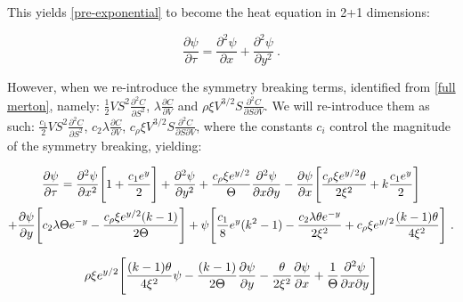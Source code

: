 \documentclass[english,12pt]{article}
\begin{document}
This yields \ref{pre-exponential} to become the heat equation in 2+1 dimensions:


\begin{equation}
\frac{\partial \psi}{\partial \tau} = \frac{\partial^2 \psi}{\partial x} + \frac{\partial^2 \psi}{\partial y^2}~.
\end{equation}





However, when we re-introduce the symmetry breaking terms, identified from \ref{full merton}, namely: $\frac{1}{2} V S^2 \frac{\partial^2 C}{\partial S^2}$,  $\lambda \frac{\partial C}{\partial V} $ and $\rho \xi V^{3/2} S \frac{\partial^2 C}{\partial S \partial V} $. We will re-introduce them as such:  $\frac{c_1}{2} V S^2 \frac{\partial^2 C}{\partial S^2}$, $c_2 \lambda \frac{\partial C}{\partial V}$, $c_{\rho} \xi V^{3/2} S \frac{\partial^2 C}{\partial S \partial V} $, where the constants $c_{i}$ control the magnitude of the symmetry breaking, yielding:

\begin{multline}
\frac{\partial \psi}{\partial \tau} = \frac{\partial^2 \psi}{\partial x^{2}}\Bigg{[}  1 +  \frac{c_{1}e^{y}}{2}  \Bigg{]} + \frac{\partial^2 \psi}{\partial y^2} + \frac{c_{\rho}\xi e^{y/2}}{\Theta}\frac{\partial^{2}\psi}{\partial x\partial y} - \frac{\partial \psi}{\partial x} \Bigg{[}\frac{ c_{\rho}\xi e^{y/2} \theta}{2\xi^{2}}  + k \frac{c_{1}e^{y}}{2}    \Bigg{]} \\ + \frac{\partial\psi}{\partial y} \Bigg{[}c_{2}\lambda\Theta e^{-y}   - \frac{c_{\rho}\xi e^{y/2}(k-1)}{2\Theta}   \Bigg{]}    + \psi \Bigg{[} \frac{c_{1}}{8}e^{y}(k^{2} - 1) - \frac{c_{2}\lambda\theta e^{-y}}{2\xi^{2}} +  c_{\rho}\xi e^{y/2}\frac{(k - 1)\theta}{4\xi^{2}}  \Bigg{]}~.
\end{multline}



\begin{equation}
\rho\xi e^{y/2} \Bigg{[} \frac{(k-1)\theta}{4\xi^{2}}\psi - \frac{(k-1)}{2\Theta}\frac{\partial\psi}{\partial y}  - \frac{\theta}{2\xi^{2}}\frac{\partial\psi}{\partial x}   +\frac{1}{\Theta}\frac{\partial^{2}\psi}{\partial x\partial y}  \Bigg{]}
\end{equation}



\end{document}
